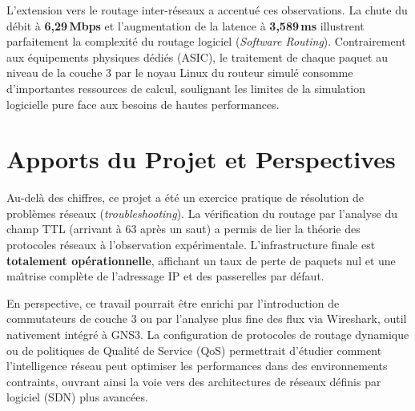 \documentclass[11pt,a4paper,oneside]{report}
\begin{document}
L'extension vers le routage inter-r\'{e}seaux a accentu\'{e} ces observations. La chute du d\'{e}bit \`{a} \textbf{6,29\,Mbps} et l'augmentation de la latence \`{a} \textbf{3,589\,ms} illustrent parfaitement la complexit\'{e} du routage logiciel (\textit{Software Routing}). Contrairement aux \'{e}quipements physiques d\'{e}di\'{e}s (ASIC), le traitement de chaque paquet au niveau de la couche 3 par le noyau Linux du routeur simul\'{e} consomme d'importantes ressources de calcul, soulignant les limites de la simulation logicielle pure face aux besoins de hautes performances.

\section{Apports du Projet et Perspectives}

Au-del\`{a} des chiffres, ce projet a \'{e}t\'{e} un exercice pratique de r\'{e}solution de probl\`{e}mes r\'{e}seaux (\textit{troubleshooting}). La v\'{e}rification du routage par l'analyse du champ TTL (arrivant \`{a} 63 apr\`{e}s un saut) a permis de lier la th\'{e}orie des protocoles r\'{e}seaux \`{a} l'observation exp\'{e}rimentale. L'infrastructure finale est \textbf{totalement op\'{e}rationnelle}, affichant un taux de perte de paquets nul et une ma\^{\i}trise complète de l'adressage IP et des passerelles par d\'{e}faut.

En perspective, ce travail pourrait être enrichi par l'introduction de commutateurs de couche 3 ou par l'analyse plus fine des flux via Wireshark, outil nativement int\'{e}gr\'{e} \`{a} GNS3. La configuration de protocoles de routage dynamique ou de politiques de Qualit\'{e} de Service (QoS) permettrait d'\'{e}tudier comment l'intelligence r\'{e}seau peut optimiser les performances dans des environnements contraints, ouvrant ainsi la voie vers des architectures de r\'{e}seaux d\'{e}finis par logiciel (SDN) plus avanc\'{e}es.




\end{document}
